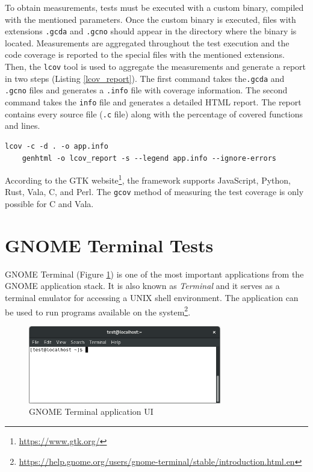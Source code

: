 To obtain measurements, tests must be executed with a custom binary, compiled with the mentioned parameters. Once the custom binary is executed, files with extensions \texttt{.gcda} and \texttt{.gcno} should appear in the directory where the binary is located. Measurements are aggregated throughout the test execution and the code coverage is reported to the special files with the mentioned extensions. Then, the \texttt{lcov} tool is used to aggregate the measurements and generate a report in two steps (Listing \ref{lcov_report}). The first command takes the\texttt{.gcda} and \texttt{.gcno} files and generates a \texttt{.info} file with coverage information. The second command takes the \texttt{info} file and generates a detailed HTML report. The report contains every source file (\texttt{.c} file) along with the percentage of covered functions and lines.

\begin{lstlisting}[language=Gherkin,caption={Shell commands used to generate an HTML report with the \texttt{lcov} tool},label={lcov_report}]
    lcov -c -d . -o app.info
    genhtml -o lcov_report -s --legend app.info --ignore-errors
\end{lstlisting}

According to the GTK website\footnote{\url{https://www.gtk.org/}}, the framework supports JavaScript, Python, Rust, Vala, C, and Perl. The \verb|gcov| method of measuring the test coverage is only possible for C and Vala.    

\section{GNOME Terminal Tests}\label{terminal}
GNOME Terminal (Figure \ref{terminal-gui}) is one of the most important applications from the GNOME application stack. It is also known as \textit{Terminal} and it serves as a terminal emulator for accessing a UNIX shell environment. The application can be used to run programs available on the system\footnote{\url{https://help.gnome.org/users/gnome-terminal/stable/introduction.html.en}}. 


\begin{figure}[H]
	\centering
	\includegraphics[width=0.75\textwidth,clip]{obrazky-figures/gnome-terminal-ui.png}
	\caption{GNOME Terminal application UI}
	\label{terminal-gui}
\end{figure}

